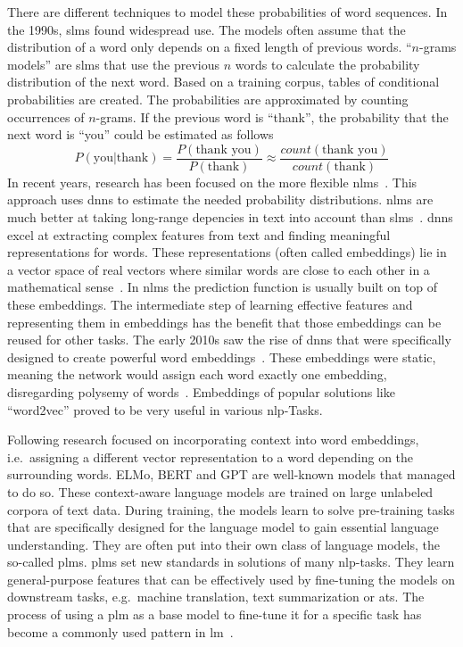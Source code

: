 There are different techniques to model these probabilities of word sequences.
In the 1990s, \glspl{slm} found widespread use.
The models often assume that the distribution of a word only depends on a fixed length of previous words.
\enquote{$n$-grams models} are \glspl{slm} that use the previous $n$ words to calculate the probability distribution of the next word.
Based on a training corpus, tables of conditional probabilities are created.
The probabilities are approximated by counting occurrences of $n$-grams.
If the previous word is \enquote{thank}, the probability that the next word is \enquote{you} could be estimated as follows~\autocite{quadarLM2020}
\[
    P(\text{you} | \text{thank}) = \frac{P(\text{thank you})}{P(\text{thank})} \approx \frac{count(\text{thank you})}{count(\text{thank})}
\]
In recent years, research has been focused on the more flexible \glspl{nlm}~\autocite{quadarLM2020}.
This approach uses \glspl{dnn} to estimate the needed probability distributions.
\glspl{nlm} are much better at taking long-range depencies in text into account than \glspl{slm}~\autocite{Hadi_2023}.
\glspl{dnn} excel at extracting complex features from text and finding meaningful representations for words.
These representations (often called embeddings) lie in a vector space of real vectors where similar words are close to each other in a mathematical sense~\autocite{quadarLM2020}.
In \glspl{nlm} the prediction function is usually built on top of these embeddings.
The intermediate step of learning effective features and representing them in embeddings has the benefit that those embeddings can be reused for other tasks.
The early 2010s saw the rise of \glspl{dnn} that were specifically designed to create powerful word embeddings~\autocite{zhao2023survey}.
These embeddings were static, meaning the network would assign each word exactly one embedding, disregarding polysemy of words~\autocite{Liu_2020}.
Embeddings of popular solutions like \enquote{word2vec} proved to be very useful in various \gls{nlp}-Tasks.

Following research focused on incorporating context into word embeddings, i.e.\ assigning a different vector representation to a word depending on the surrounding words.
ELMo, BERT and GPT are well-known models that managed to do so.
These context-aware language models are trained on large unlabeled corpora of text data.
During training, the models learn to solve pre-training tasks that are specifically designed for the language model to gain essential language understanding.
They are often put into their own class of language models, the so-called \glspl{plm}.
\glspl{plm} set new standards in solutions of many \gls{nlp}-tasks.
They learn general-purpose features that can be effectively used by fine-tuning the models on downstream tasks, e.g.\ machine translation, text summarization or \gls{ats}.
The process of using a \gls{plm} as a base model to fine-tune it for a specific task has become a commonly used pattern in \gls{lm}~\autocite{zhao2023survey}.

